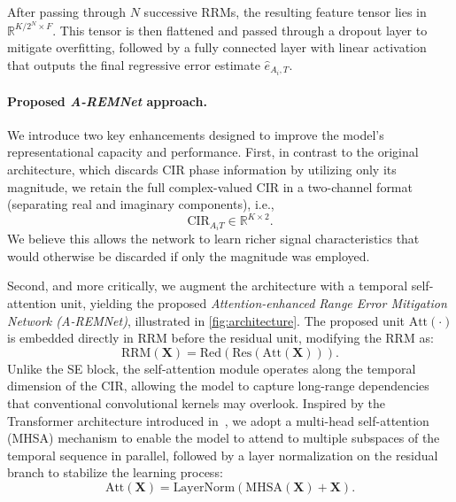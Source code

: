 After passing through $N$ successive RRMs, the resulting feature tensor lies in $\mathbb{R}^{K / 2^N \times F}$. This tensor is then flattened and passed through a dropout layer to mitigate overfitting, followed by a fully connected layer with linear activation that outputs the final regressive error estimate $\hat{e}_{A_i,T}$.

\paragraph{Proposed \emph{A-REMNet} approach.}
We introduce two key enhancements designed to improve the model's representational capacity and performance. First, in contrast to the original architecture, which discards CIR phase information by utilizing only its magnitude, we retain the full complex-valued CIR in a two-channel format (separating real and imaginary components), i.e.,
\begin{equation}
    \text{CIR}_{A_iT} \in \mathbb{R}^{K \times 2}.
\end{equation}
We believe this allows the network to learn richer signal characteristics that would otherwise be discarded if only the magnitude was employed.

Second, and more critically, we augment the architecture with a temporal self-attention unit, yielding the proposed \emph{Attention-enhanced Range Error Mitigation Network (A-REMNet)}, illustrated in \autoref{fig:architecture}. The proposed unit $\text{Att}(\cdot)$ is embedded directly in RRM before the residual unit, modifying the RRM as:
\begin{equation}
    \text{RRM}(\mathbf{X}) = \text{Red}(\text{Res}(\text{Att}(\mathbf{X}))).
\end{equation}
Unlike the SE block, the self-attention module operates along the temporal dimension of the CIR, allowing the model to capture long-range dependencies that conventional convolutional kernels may overlook. Inspired by the Transformer architecture introduced in~\cite{attention}, we adopt a multi-head self-attention (MHSA) mechanism to enable the model to attend to multiple subspaces of the temporal sequence in parallel, followed by a layer normalization on the residual branch to stabilize the learning process:
\begin{equation}
    \text{Att}(\mathbf{X}) = \text{LayerNorm}(\text{MHSA}(\mathbf{X}) + \mathbf{X}).
\end{equation}

